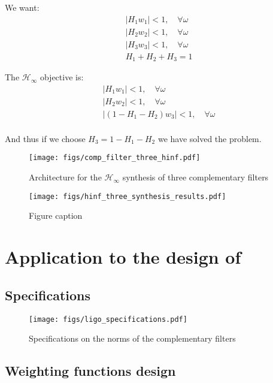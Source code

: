 \documentclass[9pt, technote, a4paper]{ieeeconf}
\begin{document}
We want:
\begin{align*}
  & |H_1 w_1| < 1, \quad \forall\omega\\
  & |H_2 w_2| < 1, \quad \forall\omega\\
  & |H_3 w_3| < 1, \quad \forall\omega\\
  & H_1 + H_2 + H_3 = 1
\end{align*}

The \(\mathcal{H}_\infty\) objective is:
\begin{align*}
  & |H_1 w_1| < 1, \quad \forall\omega\\
  & |H_2 w_2| < 1, \quad \forall\omega\\
  & |(1 - H_1 - H_2) w_3| < 1, \quad \forall\omega\\
\end{align*}

And thus if we choose \(H_3 = 1 - H_1 - H_2\) we have solved the problem.

\begin{figure}[htbp]
\centering
\texttt{[image: figs/comp\_filter\_three\_hinf.pdf]}
\caption{\label{fig:comp_filter_three_hinf}
Architecture for the \(\mathcal{H}_\infty\) synthesis of three complementary filters}
\end{figure}

\begin{figure}[htbp]
\centering
\texttt{[image: figs/hinf\_three\_synthesis\_results.pdf]}
\caption{\label{fig:hinf_three_synthesis_results}
Figure caption}
\end{figure}

\section{Application to the design of}
\label{sec:org57876bd}
\label{sec:application_ligo}

\subsection{Specifications}
\label{sec:orgc79cee4}
\label{sec:ligo_specifications}

\begin{figure}[htbp]
\centering
\texttt{[image: figs/ligo\_specifications.pdf]}
\caption{\label{fig:ligo_specifications}
Specifications on the norms of the complementary filters}
\end{figure}

\subsection{Weighting functions design}
\label{sec:org6e51da2}
\label{sec:ligo_weights}
\end{document}
